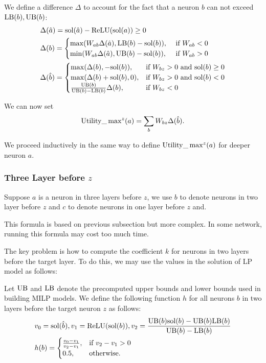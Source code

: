 We define a difference $\Delta$ to account for the fact that a neuron $b$ 
can not exceed $\mathrm{LB}(b),\mathrm{UB}(b)$:
	\begin{align*}
		&\Delta(\hat{a}) = \mathrm{sol}(\hat{a}) - \mathrm{ReLU}(\mathrm{sol}(a)) \geq 0\\
		&\Delta(b) = \begin{cases}
			\max(W_{ab}\Delta(\hat{a}),\mathrm{LB}(b)-\mathrm{sol}(b)),  &\text{ if }  W_{ab} < 0 \\
			\min(W_{ab}\Delta(\hat{a}),\mathrm{UB}(b)-\mathrm{sol}(b)),  &\text{ if }  W_{ab} > 0 \\
		\end{cases}\\
			&\Delta(\hat{b}) =
		\begin{cases}
			\max(\Delta(b),-\mathrm{sol}(b)),  &\text{if }  W_{bz} > 0 \text{ and } \mathrm{sol}(b)\geq0\\
				\max(\Delta(b)+\mathrm{sol}(b),0),  &\text{if }  W_{bz} > 0 \text{ and } \mathrm{sol}(b)<0\\
		 \frac{\mathrm{UB}(b)}{\mathrm{UB}(b)-\mathrm{LB}(b)}\Delta(b),  &\text{if }W_{bz} < 0\\
		\end{cases}
		\end{align*}

We can now set 
$$ \mathrm{Utility}\_\max\nolimits^z(a) = \sum_b W_{bz} \Delta(\hat{b}).$$
 
We proceed inductively in the same way to define $\mathrm{Utility}\_\max^z(a)$ for deeper neuron $a$.

\iffalse
\subsubsection*{Three Layer before  $z$} 

Suppose $a$ is a neuron in three layers before $z$, we use $b$ to denote neurons in two layer before $z$ and $c$ to denote neurons in one layer before $z$ and. 

This formula is based on previous subsection but more complex. In some network, running this formula may cost too much time. 

The key problem is how to compute the coefficient $k$ for neurons in two layers before the target layer. To do this, we may use the values in the solution of LP model as follows:

\begin{definition}\label{3layer}
Let $\mathrm{UB}$ and $\mathrm{LB}$ denote the precomputed upper bounds and lower bounds used in building MILP models. We define the following function $h$ for all neurons $b$ in two layers before the target neuron $z$ as follows:
	\begin{align}
		&v_0 = \mathrm{sol}(\hat{b}), v_1 = \mathrm{ReLU}(\mathrm{sol}(b)), v_2 = \frac{\mathrm{UB}(b)\mathrm{sol}(b)-\mathrm{UB}(b)\mathrm{LB}(b)}{\mathrm{UB}(b)-\mathrm{LB}(b)}\\
		&h(b) =
		\begin{cases}
			\frac{v_0-v_1}{v_2-v_1}, & \text{if } v_2-v_1 > 0\\
			0.5, & \text{otherwise.}
		\end{cases}
	\end{align} 
\end{definition} 

